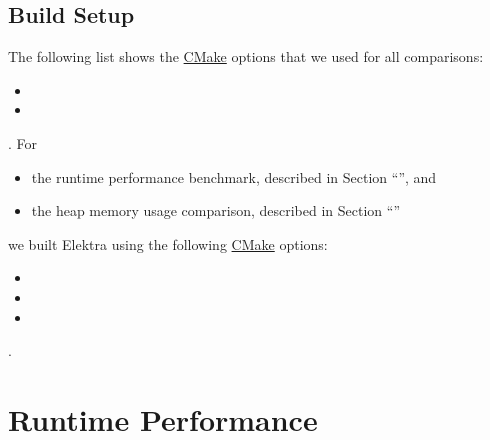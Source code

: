 \subsection{Build Setup}

The following list shows the \href{https://cmake.org}{CMake} options that we used for all comparisons:

\begin{itemize}
  \item {}
  \item {}
\end{itemize}

. For

\begin{itemize}
  \item the runtime performance benchmark, described in Section “”, and
  \item the heap memory usage comparison, described in Section “”
\end{itemize}

we built Elektra using the following \href{https://cmake.org}{CMake} options:

\begin{itemize}
  \item {}
  \item {}
  \item {}
\end{itemize}

.

\section{Runtime Performance}
\label{sec:run_time_performance}

\newcommand{\FilePluginGetSet}{{%
\codebox{%
\href{https://master.libelektra.org/benchmarks/plugingetset.c}%
{\textcolor{black}{\texttt{benchmark\_plugingetset}}}}%
}}
\newcommand{\FileBenchmarkYAML}{{%
\codebox{%
\href{https://master.libelektra.org/scripts/benchmark-yaml.in}%
{\textcolor{black}{\texttt{benchmark-yaml}}}}%
}}
\newcommand{\FileBenchmarkRuntime}{{%
\codebox{%
\href{http://rawdata.libelektra.org/tree/master/YAML/Scripts/benchmark-runtime}%
{\textcolor{black}{\texttt{benchmark-runtime}}}}%
}}
\newcommand{\ToolHyperfine}{{%
\codebox{%
\href{https://github.com/sharkdp/hyperfine}%
{\textcolor{black}{\texttt{hyperfine}}}}%
}}

